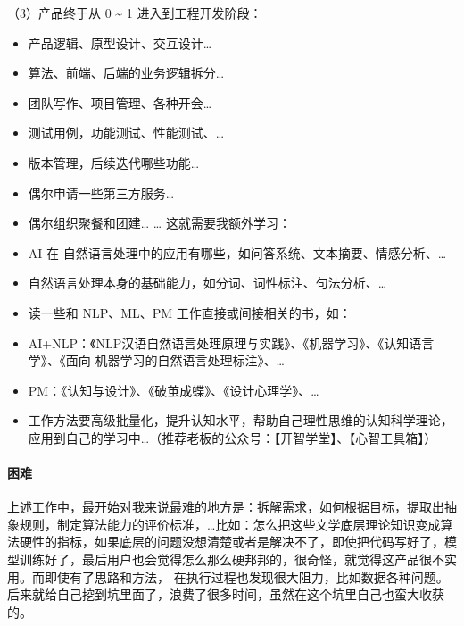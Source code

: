 \documentclass[letterpaper,10pt,english]{sphinxmanual}
\begin{document}
（3）产品终于从 0 \textasciitilde{} 1 进入到工程开发阶段：
\begin{itemize}
\item {} 
产品逻辑、原型设计、交互设计…

\item {} 
算法、前端、后端的业务逻辑拆分…

\item {} 
团队写作、项目管理、各种开会…

\item {} 
测试用例，功能测试、性能测试、…

\item {} 
版本管理，后续迭代哪些功能…

\item {} 
偶尔申请一些第三方服务…

\item {} 
偶尔组织聚餐和团建… … 这就需要我额外学习：

\item {} 
AI 在 自然语言处理中的应用有哪些，如问答系统、文本摘要、情感分析、…

\item {} 
自然语言处理本身的基础能力，如分词、词性标注、句法分析、…

\item {} 
读一些和 NLP、ML、PM 工作直接或间接相关的书，如：

\item {} 
AI+NLP：《NLP汉语自然语言处理原理与实践》、《机器学习》、《认知语言学》、《面向\sphinxhyphen{}
机器学习的自然语言处理标注》、…

\item {} 
PM：《认知与设计》、《破茧成蝶》、《设计心理学》、…

\item {} 
工作方法要高级批量化，提升认知水平，帮助自己理性思维的认知科学理论，应用到自己的学习中…（推荐老板的公众号：【开智学堂】、【心智工具箱】）

\end{itemize}


\paragraph{困难}
\label{\detokenize{chapter_experience/early_phase:id2}}
上述工作中，最开始对我来说最难的地方是：拆解需求，如何根据目标，提取出抽象规则，制定算法能力的评价标准，…比如：怎么把这些文学底层理论知识变成算法硬性的指标，如果底层的问题没想清楚或者是解决不了，即使把代码写好了，模型训练好了，最后用户也会觉得怎么那么硬邦邦的，很奇怪，就觉得这产品很不实用。而即使有了思路和方法，
在执行过程也发现很大阻力，比如数据各种问题。后来就给自己挖到坑里面了，浪费了很多时间，虽然在这个坑里自己也蛮大收获的。
\end{document}
